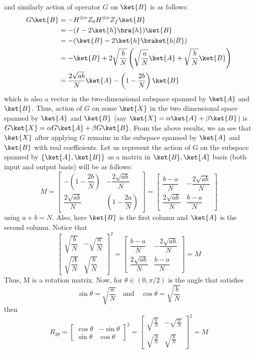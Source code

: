 \documentclass[12pt, oneside]{book}
\theoremstyle{definition}
\theoremstyle{definition}
\theoremstyle{remark}
\begin{document}
and similarly action of operator $G$ on $\ket{B}$ is as follows:
\begin{align*}
    G\ket{B}&=-H^{\otimes n}Z_0H^{\otimes n}Z_f\ket{B}\\
    &=-(I-2\ket{h}\bra{h})\ket{B}\\
    &=-(\ket{B}-2\ket{h}\braket{h|B})\\
    &=-\ket{B}+2\sqrt{\frac{b}{N}}\left(\sqrt{\frac{a}{N}}\ket{A}+\sqrt{\frac{b}{N}}\ket{B}\right)\\
    &=\frac{2\sqrt{ab}}{N}\ket{A}-\left(1-\frac{2b}{N}\right)\ket{B}
\end{align*}
which is also a vector in the two-dimensional subspace spanned by $\ket{A}$ and $\ket{B}$. Thus, action of $G$ on some $\ket{X}$ in the two dimensional space spanned by $\ket{A}$ and $\ket{B}$ (say $\ket{X}=\alpha\ket{A}+\beta\ket{B}$) is $G\ket{X}=\alpha G\ket{A}+\beta G\ket{B}$. From the above results, we an see that $\ket{X}$ after applying $G$ remains in the subspace spanned by $\ket{A}$ and $\ket{B}$ with real coefficients. Let us represent the action of G on the subspace spanned by $\{\ket{A},\ket{B}\}$ as a matrix in $\ket{B},\ket{A}$ basis (both input and output basis) will be as follows:
\[
M=\begin{bmatrix} -\left(1-\dfrac{2b}{N}\right) & -\dfrac{2\sqrt{ab}}{N} \\ \dfrac{2\sqrt{ab}}{N} & \left(1-\dfrac{2a}{N}\right) \end{bmatrix} = \begin{bmatrix} \dfrac{b-a}{N} & -\dfrac{2\sqrt{ab}}{N} \\ \dfrac{2\sqrt{ab}}{N} & \dfrac{b-a}{N} \end{bmatrix}
\]
using $a+b=N$. Also, here $\ket{B}$ is the first column and $\ket{A}$ is the second column. Notice that
\[
\begin{bmatrix} \sqrt{\dfrac{b}{N}} & -\sqrt{\dfrac{a}{N}} \\ \sqrt{\dfrac{A}{N}} & \sqrt{\dfrac{b}{N}} \end{bmatrix}^2=\begin{bmatrix} \dfrac{b-a}{N} & -\dfrac{2\sqrt{ab}}{N} \\ \dfrac{2\sqrt{ab}}{N} & \dfrac{b-a}{N} \end{bmatrix}=M
\]
Thus, M is a rotation matrix. Now, for $\theta \in (0,\pi/2)$ is the angle that satisfies
\[
\sin \theta = \sqrt{\frac{a}{N}} \quad \text{and} \quad  \cos \theta = \sqrt{\frac{b}{N}}
\]
then
\[
R_{2\theta}=\begin{bmatrix} \cos \theta &-\sin\theta \\ \sin \theta & \cos \theta \end{bmatrix}^2=\begin{bmatrix} \sqrt{\frac{b}{N}} & -\sqrt{\frac{a}{N}} \\ \sqrt{\frac{A}{N}} & \sqrt{\frac{b}{N}} \end{bmatrix}^2=M
\]
\end{document}
